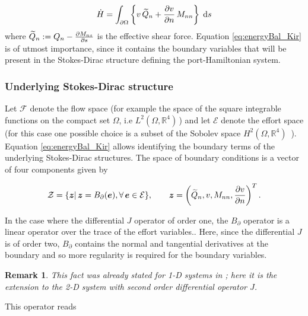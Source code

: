 \documentclass[preprint,12pt]{elsarticle}
\newtheorem{remark}{Remark}
\begin{document}
	\begin{equation}
	\label{eq:energyBal_Kir}
	\dot{H} = \int_{\partial \Omega} \left\{ v \, \widetilde{Q}_n + \diffp{v}{n} \, M_{nn}\right\} \d{s}
	\end{equation} 
	where $\widetilde{Q}_n := Q_n - \diffp{M_{ns}}{s}$ is the effective shear force.
	Equation \eqref{eq:energyBal_Kir} is of utmost importance, since it contains the boundary variables that will be present in the Stokes-Dirac structure defining the port-Hamiltonian system.
	

	\subsubsection{Underlying Stokes-Dirac structure} 
	
	Let $\mathcal{F}$ denote the flow space (for example the space of the square integrable functions on the compact set $\Omega$, i.e $L^2(\Omega, \mathbb{R}^4) \,$) and let $\mathcal{E}$ denote the effort space (for this case one possible choice is a subset of the Sobolev space $H^2(\Omega, \mathbb{R}^4) \,$ ). Equation \eqref{eq:energyBal_Kir} allows identifying the boundary terms of the underlying Stokes-Dirac structures. The space of boundary conditions is a vector of four components given by
	
	\begin{equation*}
	\mathcal{Z} = \{\bm{z} | \, \bm{z} = B_{\partial}(\bm{e}), \forall \, \bm{e} \in \mathcal{E} \},  \qquad \bm{z} = \left( \widetilde{Q}_n, v, M_{nn}, \diffp{v}{n} \right)^T .
	\end{equation*}
	
	In the case where the differential $J$ operator of order one, the $B_{\partial}$ operator is  a linear operator over the trace of the effort variables.. Here, since the differential $J$ is of order two,  $B_{\partial}$ contains the normal and tangential derivatives at the boundary and so more regularity is required for the boundary variables.
	\begin{remark}
	This fact was already stated for 1-D systems in \cite{LeGorrec2005}; here it is the extension to the 2-D system with second order differential operator $J$.
	\end{remark}
	 This operator reads
	
\end{document}
